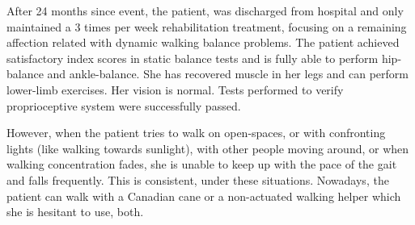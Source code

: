 \documentclass[conference]{IEEEtran}
\begin{document}
After 24 months since event, the patient, was discharged from hospital and only maintained a 3 times per week rehabilitation treatment, focusing on a remaining affection related with dynamic walking balance problems.  The patient achieved satisfactory index scores in static balance tests and is fully able to perform hip-balance and ankle-balance.  She has recovered muscle in her legs and can perform lower-limb exercises.  Her vision is normal.   Tests performed to verify proprioceptive system were successfully passed.

However, when the patient tries to walk on open-spaces, or with confronting lights (like walking towards sunlight), with other people moving around, or when walking concentration fades, she is unable to keep up with the pace of the gait and falls frequently.  This is consistent, under these situations.  Nowadays, the patient can walk with a Canadian cane or a non-actuated walking helper which she is hesitant to use, both.
\end{document}
